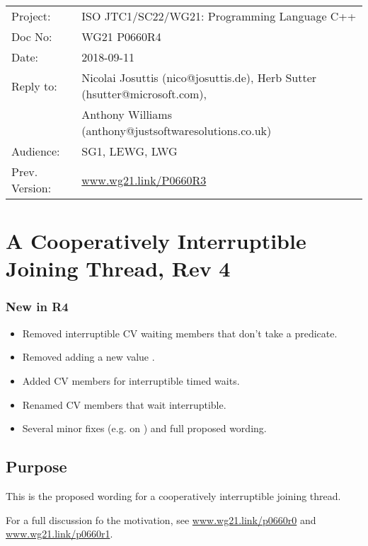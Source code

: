 
{\small
\begin{tabular}{@{}ll}
Project:  	& ISO JTC1/SC22/WG21: Programming Language C++ \\
Doc No: 	& WG21 P0660R4 \\
Date: 		& 2018-09-11 \\
Reply to: 	& Nicolai Josuttis (nico@josuttis.de), Herb Sutter (hsutter@microsoft.com), \\
                &         Anthony Williams (anthony@justsoftwaresolutions.co.uk) \\
Audience: 	& SG1, LEWG, LWG \\
Prev. Version:	& \url{www.wg21.link/P0660R3} \\
\end{tabular}
}

\section*{{\huge{}A Cooperatively Interruptible Joining Thread, Rev 4}}

\subsubsection*{New in R4}
\begin{itemize}
 \item Removed interruptible CV waiting members that don't take a predicate.
 \item Removed adding a new  value .
 \item Added CV members for interruptible timed waits.
 \item Renamed CV members that wait interruptible.
 \item Several minor fixes (e.g. on ) and full proposed wording.
\end{itemize}

\subsection*{Purpose}

This is the proposed wording for a cooperatively interruptible joining thread.

For a full discussion fo the motivation, see
\url{www.wg21.link/p0660r0} and
\url{www.wg21.link/p0660r1}.

